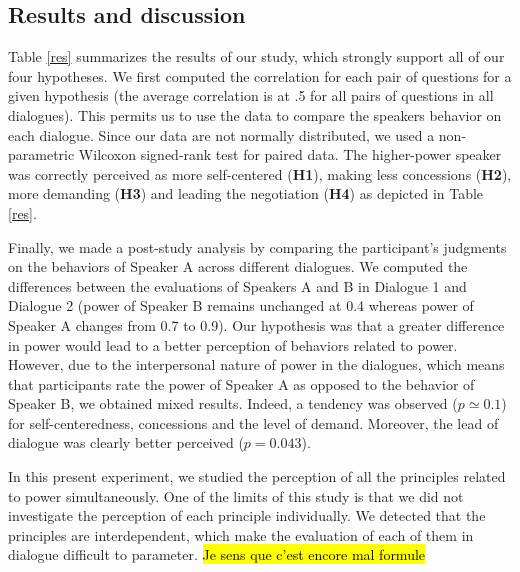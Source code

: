\documentclass{llncs}
\begin{document}
			\subsection{Results and discussion}
			\vspace{-.5em} 
			Table  \ref{res} summarizes the results of our study, which strongly support all of our four hypotheses. We first computed the correlation for each pair of questions for a given hypothesis (the average correlation is at .5 for all pairs of questions in all dialogues). This permits us to use the data to compare the speakers behavior on each dialogue. Since our data are not normally distributed, we used a non-parametric Wilcoxon signed-rank test for paired data. The higher-power speaker was correctly perceived as more self-centered (\textbf{H1}), making less concessions (\textbf{H2}), more demanding (\textbf{H3}) and leading the negotiation (\textbf{H4}) as depicted in Table \ref{res}.
			
			Finally, we made a post-study analysis by comparing the participant's judgments on the behaviors of Speaker A across different dialogues. We computed the differences between the evaluations of Speakers A and B in Dialogue 1 and Dialogue 2 (power of Speaker B remains unchanged at 0.4 whereas power of Speaker A changes from 0.7 to 0.9). 
			Our hypothesis was that a greater difference in power would lead to a better perception of behaviors related to power. However, due to the interpersonal nature of power in the dialogues, which means that participants rate the power of Speaker A as opposed to the behavior of Speaker B, we obtained mixed results. Indeed, a tendency was observed ($p\simeq 0.1$) for self-centeredness, concessions and the level of demand. Moreover, the lead of dialogue was clearly better perceived ($p=0.043$).
			
			In this present experiment, we studied the perception of all the principles related to power simultaneously. One of the limits of this study is that we did not investigate the perception of each principle individually. We detected that the principles are interdependent, which make the evaluation of each of them in dialogue difficult to parameter. \hl{Je sens que c'est encore mal formule}
			
\end{document}
